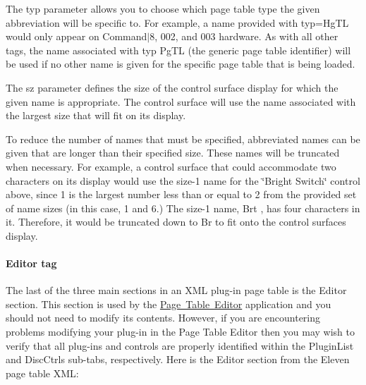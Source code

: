 The {\ttfamily typ} parameter allows you to choose which page table type the given abbreviation will be specific to. For example, a name provided with {\ttfamily typ=\textquotesingle{}Hg\+TL\textquotesingle{}} would only appear on Command$\vert$8, 002, and 003 hardware. As with all other tags, the name associated with typ {\ttfamily Pg\+TL} (the generic page table identifier) will be used if no other name is given for the specific page table that is being loaded.

The {\ttfamily sz} parameter defines the size of the control surface display for which the given name is appropriate. The control surface will use the name associated with the largest size that will fit on its display.

To reduce the number of names that must be specified, abbreviated names can be given that are longer than their specified size. These names will be truncated when necessary. For example, a control surface that could accommodate two characters on its display would use the size-\/1 name for the \char`\"{}\+Bright Switch\char`\"{} control above, since 1 is the largest number less than or equal to 2 from the provided set of name sizes (in this case, 1 and 6.) The size-\/1 name, {\ttfamily \textquotesingle{}Brt \textquotesingle{}}, has four characters in it. Therefore, it would be truncated down to {\ttfamily \textquotesingle{}Br\textquotesingle{}} to fit onto the control surface\textquotesingle{}s display.

\hypertarget{a00833_subsubsection_editor_tag}{}\paragraph{Editor tag}\label{a00833_subsubsection_editor_tag}
The last of the three main sections in an X\+ML plug-\/in page table is the {\ttfamily Editor} section. This section is used by the \mbox{\hyperlink{a00833_subsection_creating_page_tables_in_pete}{Page Table Editor}} application and you should not need to modify its contents. However, if you are encountering problems modifying your plug-\/in in the Page Table Editor then you may wish to verify that all plug-\/ins and controls are properly identified within the {\ttfamily Plugin\+List} and {\ttfamily Disc\+Ctrls} sub-\/tabs, respectively. Here is the {\ttfamily Editor} section from the Eleven page table X\+ML\+:


